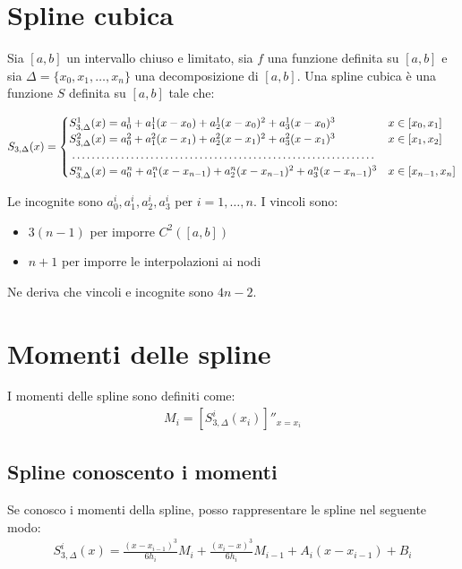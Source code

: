 \section{Spline cubica}
Sia $[a, b]$ un intervallo chiuso e limitato, sia $f$ una funzione definita su $[a, b]$ e sia $\Delta = \{x_0, x_1, \dots, x_n\}$ una decomposizione di $[a, b]$. Una spline cubica è una funzione $S$ definita su $[a, b]$ tale che:

\begin{align}
  S_{3, \Delta}(x) = \begin{cases}
    S_{3, \Delta}^1(x) = a^1_0 + a^1_1(x - x_0) + a^1_2(x - x_0)^2 + a^1_3(x - x_0)^3 & x \in [x_0, x_1] \\
    S_{3, \Delta}^2(x) = a^2_0 + a^2_1(x - x_1) + a^2_2(x - x_1)^2 + a^2_3(x - x_1)^3 & x \in [x_1, x_2] \\
    \dotfill \\
    S_{3, \Delta}^n(x) = a^n_0 + a^n_1(x - x_{n-1}) + a^n_2(x - x_{n-1})^2 + a^n_3(x - x_{n-1})^3 & x \in [x_{n-1}, x_{n}]
  \end{cases}
\end{align}


Le incognite sono $a^i_0, a^i_1, a^i_2, a^i_3$ per $i = 1, \dots, n$.
I vincoli sono:
\begin{itemize}
  \item $3(n-1)$ per imporre $C^2([a, b])$
  \item $n+1$ per imporre le interpolazioni ai nodi
\end{itemize}


Ne deriva che vincoli e incognite sono $4n - 2$.

\section{Momenti delle spline}


I momenti delle spline sono definiti come:
\begin{align}
  M_i = [S_{3, \Delta}^i(x_i)]''_{x=x_i}
\end{align}



\subsection{Spline conoscento i momenti}
Se conosco i momenti della spline, posso rappresentare le spline nel seguente modo:
\begin{align}
  S_{3, \Delta}^i(x) = \frac{(x - x_{i-1})^3}{6h_i} M_i + \frac{(x_i -x)^3}{6h_i} M_{i-1} + A_i(x- x_{i-1}) + B_i
\end{align}

